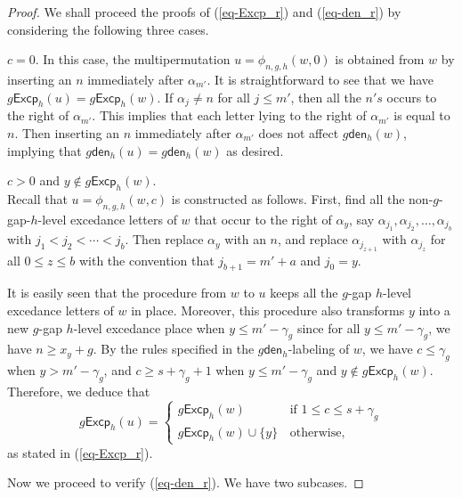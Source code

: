 \documentclass[12pt]{article}
\numberwithin{equation}{section}
\theoremstyle{plain}
\def\den{\mathsf{den}}
\def\Excp{\mathsf{Excp}}
\begin{document}
\begin{proof}
We shall proceed the proofs of  (\ref{eq-Excp_r})	and (\ref{eq-den_r}) by considering the following three cases.

 $c=0$. 
In this case, the multipermutation $u=\phi_{n,g,h}(w, 0)$ is obtained from $w$ by inserting an $n$ immediately after $\alpha_{m'}$. It is straightforward to see that we have $ 
g\Excp_h(u)=g\Excp_h(w).
$ 	If $\alpha_j\neq n$ for all $j\leq m'$, then all the $n's$ occurs to the right of $\alpha_{m'}$. This implies that each letter lying to the right of $\alpha_{m'}$ is equal to $n$. Then inserting  an $n$ immediately after $\alpha_{m'}$ does not affect  $g\den_{h}(w)$, implying that 
$g\den_h(u)=g\den_h(w)$ as desired. 


  $c>0$ and $y\notin g\Excp_h(w)$.\\
Recall that $u=\phi_{n,g,h}(w,c)$ is constructed  as follows.
	First, find all the  non-$g$-gap-$h$-level excedance letters of $w$ that occur    to  the right  of $\alpha_{y}$, say $\alpha_{j_1}, \alpha_{j_2}, \ldots, \alpha_{j_b}$ with $ j_1<j_2<\cdots<j_b$.  Then  replace $\alpha_{y}$ with an  $n$,   and replace  $\alpha_{j_{z+1}}$ with $\alpha_{j_{z}}$ for all $0\leq z\leq b $ with the convention that $j_{b+1}=m'+a$ and $j_0=y$.
	
	It is easily seen that  the procedure  from $w$ to $u$ keeps  all the $g$-gap $h$-level excedance letters of $w$  in   place.  Moreover,   this  procedure  also transforms $y$ into   a new  $g$-gap $h$-level excedance place when $y\leq m'-\gamma_g$ since for all $y\leq m'-\gamma_g$, we have $n\geq x_{y}+g$. 
	By the rules specified in the $g\den_h$-labeling of $w$, we have $c\leq \gamma_g$ when $y>m'-\gamma_g$,  and   $c\geq s+\gamma_g+1$ when $y\leq m'-\gamma_g$ and $y\notin g\Excp_h(w)$.  Therefore, we deduce that
	 $$
	 	g\Excp_h(u)=\left\{ \begin{array}{ll}
	 	g\Excp_h(w)&\, \mathrm{if}\,\,   1\leq c\leq s+\gamma_g  \\
	 	g\Excp_h(w)\cup \{y\}&\, \mathrm{otherwise},
	 \end{array}
	 \right.
	 $$
	as stated in (\ref{eq-Excp_r}). 
	       
Now we proceed to verify  (\ref{eq-den_r}).  We have two subcases. 


\end{proof}
\end{document}

